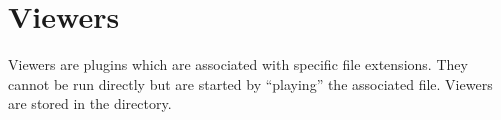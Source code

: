 {}




{}



\section{\label{ref:Viewersplugins}Viewers}

Viewers are plugins which are associated with specific file extensions.
They cannot be run directly but are started by ``playing'' the associated file.
Viewers are stored in the  directory.
\par
{}
